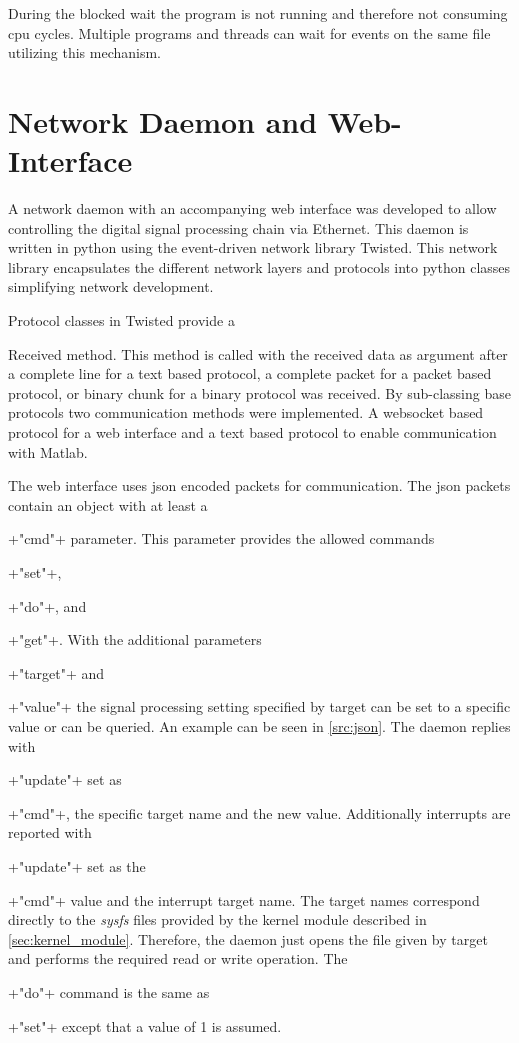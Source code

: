 \documentclass[12pt,a4paper,parskip=full,abstract=true,BCOR=12mm,twoside,open=right]{scrreprt}
\newcommand*{\SavedLstInline}{}
\DeclareRobustCommand*{\lstinline}{%
  \ifmmode
    \let\SavedBGroup\bgroup
    \def\bgroup{%
      \let\bgroup\SavedBGroup
      \hbox\bgroup
    }%
  \fi
  \SavedLstInline
}
\def\device#1{\mbox{\textit{#1}}}
\begin{document}
During the blocked wait the program is not running and therefore not
consuming \gls{cpu} cycles. Multiple programs and threads can wait
for events on the same file utilizing this mechanism.


\section{Network Daemon and Web-Interface}
\label{sec:daemon}
\lstset{language=python}

A network daemon with an accompanying web interface was developed to allow
controlling the digital signal processing chain via Ethernet. This daemon
is written in python using the event-driven network library Twisted\cite{twisted}.
This network library encapsulates the different network layers and protocols
into python classes simplifying network development.

Protocol classes in Twisted provide a \lstinline{Received} method. This method
is called with the received data as argument after a complete line for a text based
protocol, a complete packet for a packet based protocol, or binary chunk for a binary
protocol was received. By sub-classing base protocols two communication methods were
implemented. A websocket based protocol for a web interface and a text based protocol
to enable communication with Matlab.

The web interface uses \gls{json} encoded packets for communication. The \gls{json}
packets contain an object with at least a \lstinline+"cmd"+ parameter. This parameter
provides the allowed commands \lstinline+"set"+, \lstinline+"do"+, and \lstinline+"get"+.
With the additional parameters \lstinline+"target"+ and \lstinline+"value"+ the signal
processing setting specified by target can be set to a specific value or can be queried. An example
can be seen in \cref{src:json}. The daemon replies
with \lstinline+"update"+ set as \lstinline+"cmd"+, the specific target name and the
new value. Additionally interrupts are reported with \lstinline+"update"+ set as the
\lstinline+"cmd"+ value and the interrupt target name. The target names correspond
directly to the \device{sysfs} files provided by the kernel module described in
\cref{sec:kernel_module}. Therefore, the daemon just opens the file given by target
and performs the required read or write operation. The \lstinline+"do"+ command is the same
as \lstinline+"set"+ except that a value of 1 is assumed.
\end{document}
